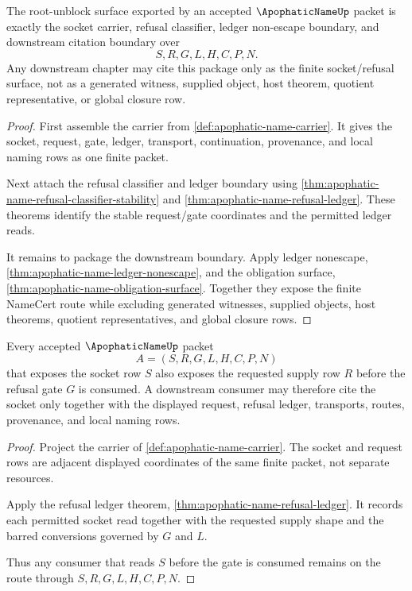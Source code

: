 \begin{theorem}
\label{thm:apophatic-name-root-downstream-boundary-package}
The root-unblock surface exported by an accepted $\ApophaticNameUp$ packet is exactly the socket carrier, refusal classifier, ledger non-escape boundary, and downstream citation boundary over
$$
S,R,G,L,H,C,P,N.
$$
Any downstream chapter may cite this package only as the finite socket/refusal surface, not as a generated witness, supplied object, host theorem, quotient representative, or global closure row.
\end{theorem}
\begin{proof}
First assemble the carrier from \autoref{def:apophatic-name-carrier}. It gives the socket, request, gate, ledger, transport, continuation, provenance, and local naming rows as one finite packet.

Next attach the refusal classifier and ledger boundary using \autoref{thm:apophatic-name-refusal-classifier-stability} and \autoref{thm:apophatic-name-refusal-ledger}. These theorems identify the stable request/gate coordinates and the permitted ledger reads.

It remains to package the downstream boundary. Apply ledger nonescape, \autoref{thm:apophatic-name-ledger-nonescape}, and the obligation surface, \autoref{thm:apophatic-name-obligation-surface}. Together they expose the finite NameCert route while excluding generated witnesses, supplied objects, host theorems, quotient representatives, and global closure rows.
\end{proof}

\begin{theorem}
\label{thm:apophatic-name-socket-request-coherence}
Every accepted $\ApophaticNameUp$ packet
$$
A=(S,R,G,L,H,C,P,N)
$$
that exposes the socket row $S$ also exposes the requested supply row $R$ before the refusal gate $G$ is consumed. A downstream consumer may therefore cite the socket only together with the displayed request, refusal ledger, transports, routes, provenance, and local naming rows.
\end{theorem}
\begin{proof}
Project the carrier of \autoref{def:apophatic-name-carrier}. The socket and request rows are adjacent displayed coordinates of the same finite packet, not separate resources.

Apply the refusal ledger theorem, \autoref{thm:apophatic-name-refusal-ledger}. It records each permitted socket read together with the requested supply shape and the barred conversions governed by $G$ and $L$.

Thus any consumer that reads $S$ before the gate is consumed remains on the route through $S,R,G,L,H,C,P,N$.
\end{proof}

